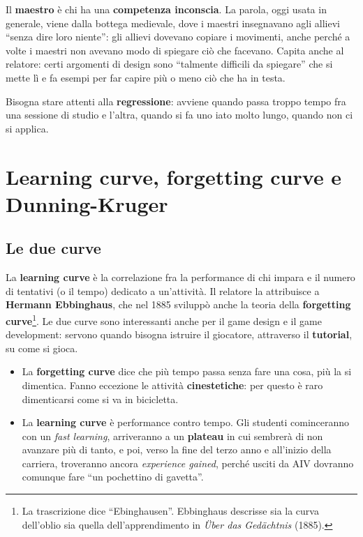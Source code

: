 Il \textbf{maestro} è chi ha una \textbf{competenza inconscia}. La parola,
oggi usata in generale, viene dalla bottega medievale, dove i maestri
insegnavano agli allievi ``senza dire loro niente'': gli allievi dovevano
copiare i movimenti, anche perché a volte i maestri non avevano modo di
spiegare ciò che facevano. Capita anche al relatore: certi argomenti di
design sono ``talmente difficili da spiegare'' che si mette lì e fa esempi
per far capire più o meno ciò che ha in testa.

Bisogna stare attenti alla \textbf{regressione}: avviene quando passa troppo
tempo fra una sessione di studio e l'altra, quando si fa uno iato molto
lungo, quando non ci si applica.

\section{Learning curve, forgetting curve e Dunning-Kruger}
\label{p0:sec:curve}

\subsection{Le due curve}

La \textbf{learning curve} è la correlazione fra la performance di chi
impara e il numero di tentativi (o il tempo) dedicato a un'attività. Il
relatore la attribuisce a \textbf{Hermann Ebbinghaus}, che nel 1885
sviluppò anche la teoria della \textbf{forgetting curve}\footnote{La
trascrizione dice ``Ebinghausen''. Ebbinghaus descrisse sia la curva
dell'oblio sia quella dell'apprendimento in \emph{Über das Gedächtnis}
(1885).}. Le due curve sono interessanti anche per il game design e il game
development: servono quando bisogna istruire il giocatore, attraverso il
\textbf{tutorial}, su come si gioca.
\begin{itemize}
  \item La \textbf{forgetting curve} dice che più tempo passa senza fare
        una cosa, più la si dimentica. Fanno eccezione le attività
        \textbf{cinestetiche}: per questo è raro dimenticarsi come si va in
        bicicletta.
  \item La \textbf{learning curve} è performance contro tempo. Gli
        studenti cominceranno con un \emph{fast learning}, arriveranno a un
        \textbf{plateau} in cui sembrerà di non avanzare più di tanto, e
        poi, verso la fine del terzo anno e all'inizio della carriera,
        troveranno ancora \emph{experience gained}, perché usciti da AIV
        dovranno comunque fare ``un pochettino di gavetta''.
\end{itemize}

